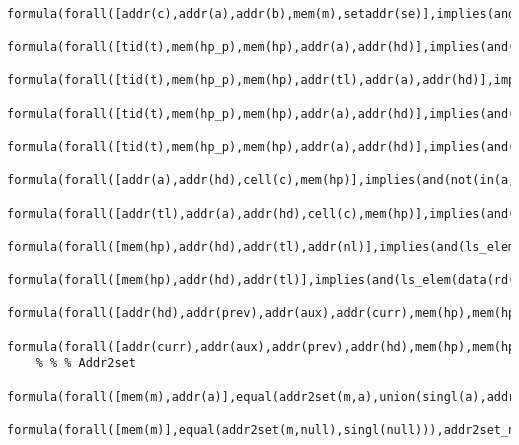 \begin{lstlisting}
    formula(forall([addr(c),addr(a),addr(b),mem(m),setaddr(se)],implies(and(in(a,se),equal(se,addr2set(m,b)),equal(c,next(rd(m,a))),not(equal(a,null))),in(c,se))),nextreg).
    formula(forall([tid(t),mem(hp_p),mem(hp),addr(a),addr(hd)],implies(and(equal(hp_p,upd(hp,a,mkcell(data(rd(hp,a)),next(rd(hp,a)),t)))),equal(addr2set(hp,hd),addr2set(hp_p,hd)))),lock_keeps_addr2set).
    formula(forall([tid(t),mem(hp_p),mem(hp),addr(tl),addr(a),addr(hd)],implies(and(equal(hp_p,upd(hp,a,mkcell(data(rd(hp,a)),next(rd(hp,a)),t)))),equiv(orderlist(hp,hd,tl),orderlist(hp_p,hd,tl)))),lock_keeps_orderlist).
    formula(forall([tid(t),mem(hp_p),mem(hp),addr(a),addr(hd)],implies(and(equal(hp_p,upd(hp,a,mkcell(data(rd(hp,a)),next(rd(hp,a)),t)))),equal(data(rd(hp,a)),data(rd(hp_p,a))))),lock_keeps_heap__data).
    formula(forall([tid(t),mem(hp_p),mem(hp),addr(a),addr(hd)],implies(and(equal(hp_p,upd(hp,a,mkcell(data(rd(hp,a)),next(rd(hp,a)),t)))),equal(next(rd(hp,a)),next(rd(hp_p,a))))),lock_keeps_heap__next).
    formula(forall([addr(a),addr(hd),cell(c),mem(hp)],implies(and(not(in(a,addr2set(hp,hd)))),equal(addr2set(hp,hd),addr2set(upd(hp,a,c),hd)))),not_in_region__not_change_heap_addr).
    formula(forall([addr(tl),addr(a),addr(hd),cell(c),mem(hp)],implies(and(not(in(a,addr2set(hp,hd)))),equiv(orderlist(hp,hd,tl),orderlist(upd(hp,a,c),hd,tl)))),not_in_region__not_change_heap_list).
    formula(forall([mem(hp),addr(hd),addr(tl),addr(nl)],implies(and(ls_elem(data(rd(hp,hd)),data(rd(hp,tl))),equal(next(rd(hp,hd)),tl),equal(next(rd(hp,tl)),nl)),orderlist(hp,hd,tl))),order_primim).
    formula(forall([mem(hp),addr(hd),addr(tl)],implies(and(ls_elem(data(rd(hp,hd)),data(rd(hp,tl))),equal(next(rd(hp,hd)),tl),equal(next(rd(hp,tl)),null)),equal(addr2set(hp,hd),union(union(singl(hd),singl(tl)),singl(null))))),addr2set_primim).
    formula(forall([addr(hd),addr(prev),addr(aux),addr(curr),mem(hp),mem(hp_p),setaddr(reg),setaddr(reg_p)],implies(and(equal(reg,addr2set(hp,hd)),equal(union(reg,singl(aux)),reg_p),equal(next(rd(hp,prev)),curr),not(equal(prev,curr)),equal(next(rd(hp,aux)),curr),not(equal(aux,null)),not(equal(prev,null)),not(equal(curr,null)),in(prev,addr2set(hp,hd)),equal(hp_p,upd(hp,prev,mkcell(data(rd(hp,prev)),aux,lockid(rd(hp,prev)))))),equal(reg_p,addr2set(hp_p,hd)))),insert__keeps_addr2set).
    formula(forall([addr(curr),addr(aux),addr(prev),addr(hd),mem(hp),mem(hp_p)],implies(and(equal(next(rd(hp,curr)),aux),equal(next(rd(hp,prev)),curr),not(equal(aux,next(rd(hp,prev)))),equal(hp_p,upd(hp,prev,mkcell(data(rd(hp,prev)),aux,lockid(rd(hp,prev))))),not(equal(aux,null)),in(curr,addr2set(hp,hd)),in(null,addr2set(hp,hd)),in(prev,addr2set(hp,hd))),equal(setDiff(addr2set(hp,hd),singl(curr)),addr2set(hp_p,hd)))),remove__keeps_addr2set).
    % % % Addr2set
    formula(forall([mem(m),addr(a)],equal(addr2set(m,a),union(singl(a),addr2set(m,next(rd(m,a)))))),addr2set_rec_def).
    formula(forall([mem(m)],equal(addr2set(m,null),singl(null))),addr2set_null__is__singl_null).






\end{lstlisting}
